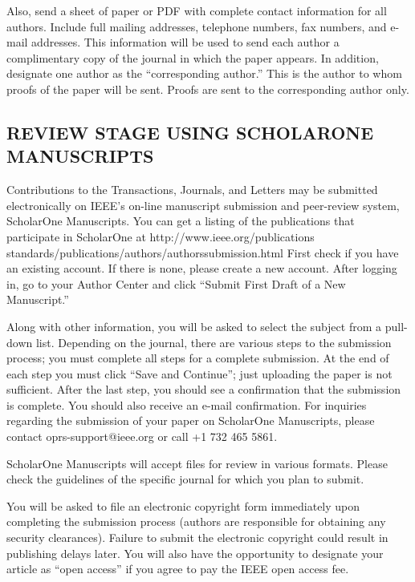 \documentclass{IEEEoj}
\begin{document}
Also, send a sheet of paper or PDF with complete contact information for all 
authors. Include full mailing addresses, telephone numbers, fax numbers, and 
e-mail addresses. This information will be used to send each author a 
complimentary copy of the journal in which the paper appears. In addition, 
designate one author as the ``corresponding author.'' This is the author to 
whom proofs of the paper will be sent. Proofs are sent to the corresponding 
author only.

\subsection{REVIEW STAGE USING SCHOLARONE{\textregistered} MANUSCRIPTS}
Contributions to the Transactions, Journals, and Letters may be submitted 
electronically on IEEE's on-line manuscript submission and peer-review 
system, ScholarOne{\textregistered} Manuscripts. You can get a 
listing of the publications that participate in ScholarOne at 
http://www.ieee.org/\discretionary{}{}{}publications\textunderscore 
standards/publications/authors/authors\textunderscore\break submission.html First 
check if you have an existing account. If there is none, please create a new 
account. After logging in, go to your Author Center and click ``Submit First 
Draft of a New Manuscript.'' 

Along with other information, you will be asked to select the subject from a 
pull-down list. Depending on the journal, there are various steps to the 
submission process; you must complete all steps for a complete submission. 
At the end of each step you must click ``Save and Continue''; just uploading 
the paper is not sufficient. After the last step, you should see a 
confirmation that the submission is complete. You should also receive an 
e-mail confirmation. For inquiries regarding the submission of your paper on 
ScholarOne Manuscripts, please contact oprs-support@ieee.org or call +1 
732 465 5861.

ScholarOne Manuscripts will accept files for review in various formats. 
Please check the guidelines of the specific journal for which you plan to 
submit. 

You will be asked to file an electronic copyright form immediately upon 
completing the submission process (authors are responsible for obtaining any 
security clearances). Failure to submit the electronic copyright could 
result in publishing delays later. You will also have the opportunity to 
designate your article as ``open access'' if you agree to pay the IEEE open 
access fee. 
\end{document}
